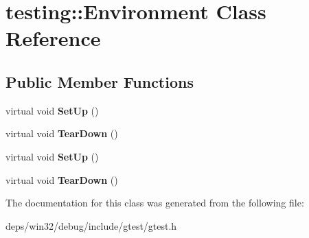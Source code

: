 \hypertarget{classtesting_1_1_environment}{}\section{testing\+:\+:Environment Class Reference}
\label{classtesting_1_1_environment}
\subsection*{Public Member Functions}
\begin{DoxyCompactItemize}
\item 
\hypertarget{classtesting_1_1_environment_a1bf8cafaa9d4eba9feb98655ee434eb3}{}virtual void {\bfseries Set\+Up} ()\label{classtesting_1_1_environment_a1bf8cafaa9d4eba9feb98655ee434eb3}

\item 
\hypertarget{classtesting_1_1_environment_a039bdaa705c46b9b88234cf4d3bb6254}{}virtual void {\bfseries Tear\+Down} ()\label{classtesting_1_1_environment_a039bdaa705c46b9b88234cf4d3bb6254}

\item 
\hypertarget{classtesting_1_1_environment_a1bf8cafaa9d4eba9feb98655ee434eb3}{}virtual void {\bfseries Set\+Up} ()\label{classtesting_1_1_environment_a1bf8cafaa9d4eba9feb98655ee434eb3}

\item 
\hypertarget{classtesting_1_1_environment_a039bdaa705c46b9b88234cf4d3bb6254}{}virtual void {\bfseries Tear\+Down} ()\label{classtesting_1_1_environment_a039bdaa705c46b9b88234cf4d3bb6254}

\end{DoxyCompactItemize}


The documentation for this class was generated from the following file\+:\begin{DoxyCompactItemize}
\item 
deps/win32/debug/include/gtest/gtest.\+h\end{DoxyCompactItemize}
